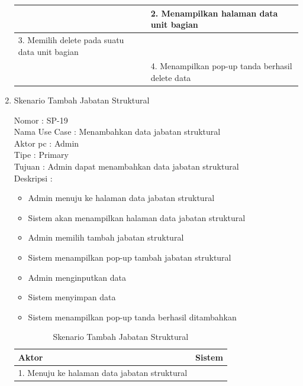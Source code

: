 \begin{enumerate}
\begin{table}
\begin{tabular}{ | p{55mm} | p{70mm} |}
		\hline
		
		&  2.	Menampilkan halaman data unit bagian \\
		
		\hline
		
		3. Memilih delete pada suatu data unit bagian & \\
		
		\hline
		
		& 4.	Menampilkan pop-up tanda berhasil delete data \\
		\hline
		
	\end{tabular}
\end{table}

\item Skenario Tambah Jabatan Struktural

Nomor \kern 3.6pc : SP-19 \\
Nama Use Case : Menambahkan data jabatan struktural \\
Aktor  pc : Admin \\
Tipe \kern 4.6pc : Primary \\
Tujuan \kern 3.6pc : Admin dapat menambahkan data jabatan struktural\\
Deskripsi \kern 2.5pc : 

\begin{itemize}
	\item Admin menuju ke halaman data jabatan struktural
	\item Sistem akan menampilkan halaman data jabatan struktural
	\item Admin memilih tambah jabatan struktural
	\item Sistem menampilkan pop-up tambah jabatan struktural
	\item Admin menginputkan data
	\item Sistem menyimpan data
	\item Sistem menampilkan pop-up tanda berhasil ditambahkan
	
\end{itemize}

\begin{table}
	\caption{Skenario Tambah Jabatan Struktural}
	\centering
	\begin{tabular}{ | p{55mm} | p{70mm} |}
		\hline 
		\textbf{Aktor} & \textbf{Sistem} \\
		\hline
		
		1.	Menuju ke halaman data jabatan struktural &  \\
		

\end{tabular}
\end{table}
\end{enumerate}
